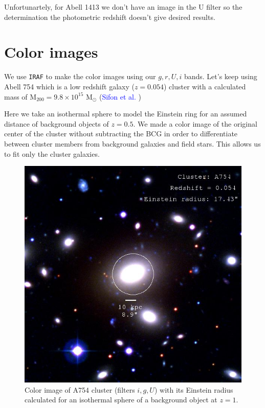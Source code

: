 Unfortunartely, for Abell 1413 we don't have an image in the U filter so the determination the photometric redshift doesn't give desired results.

\section{Color images} 

We use \texttt{IRAF} to make the color images using our $g,r,U,i$ bands. Let's keep using Abell 754 which is a low redshift galaxy ($z=0.054$) cluster with a calculated mass of $\text{M}_{200}=9.8\times 10^{15}$ $\text{M}_{\odot}$ (\textcolor{blue}{Sifon et al.} \citeyear{Reference9})

Here we take an isothermal sphere to model the Einstein ring for an assumed distance of background objects of $z=0.5$. We made a color image of the original center of the cluster without subtracting the BCG in order to differentiate between cluster members from background galaxies and field stars. This allows us to fit only the cluster galaxies. 

\begin{figure}[H]
\centering
\includegraphics[width=12cm]{images/cA754.jpg}
\caption[Color image of A754]{Color image of A754 cluster (filters $i,g,U$) with its Einstein radius calculated for an isothermal sphere of a background object at $z=1$.}
\end{figure}

